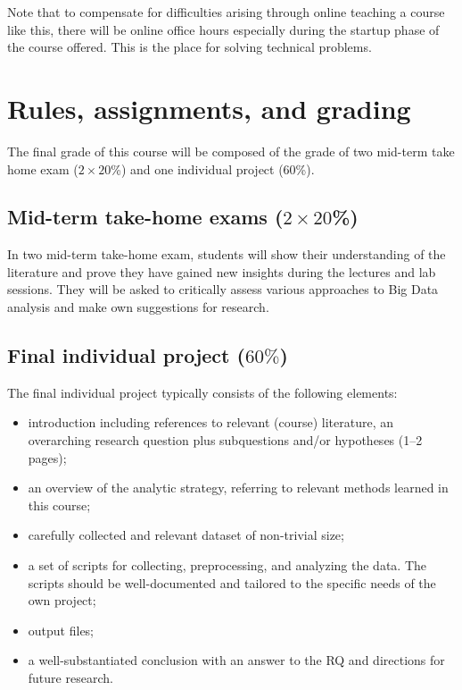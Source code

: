 \documentclass[a4paper,10pt,twocolumn]{report}
\newenvironment{corona}{%
	\begin{shaded*}%
	}{%
	\end{shaded*}%
}
\begin{document}
\begin{corona}Note that to compensate for difficulties arising through online teaching a course like this, there will be online office hours especially during the startup phase of the course offered. This is the place for solving technical problems.
\end{corona}


\chapter{Rules, assignments, and grading}
The final grade of this course will be composed of the grade of two mid-term take home exam ($2 \times 20$\%) and one individual project (60\%).

\section{Mid-term take-home exams ($2 \times 20$\%)}
In two mid-term take-home exam, students will show their understanding of the literature and prove they have gained new insights during the lectures and lab sessions. They will be asked to critically assess various approaches to Big Data analysis and make own suggestions for research.

\section{Final individual project ($60\%$)}
The final individual project typically consists of the following elements:
\begin{itemize}
\item introduction including references to relevant (course) literature, an overarching research question plus subquestions and/or hypotheses (1--2 pages);
\item an overview of the analytic strategy, referring to relevant methods learned in this course;
\item carefully collected and relevant dataset of non-trivial size;
\item a set of scripts for collecting, preprocessing, and analyzing the data. The scripts should be well-documented and tailored to the specific needs of the own project;
\item output files;
\item a well-substantiated conclusion with an answer to the RQ and directions for future research.
\end{itemize}
\end{document}
